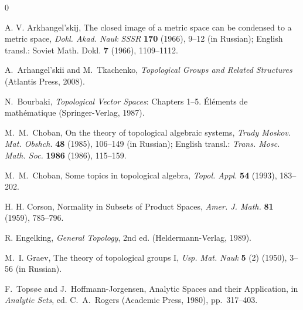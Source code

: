 \documentclass[a4paper]{amsart}
\theoremstyle{definition}
\begin{document}
\begin{thebibliography}{0}

A. V. Arkhangel'skij,
The closed image of a metric space can be condensed to a metric space, 
\emph{Dokl. Akad. Nauk SSSR} \textbf{170} (1966), 9--12 (in Russian); English transl.: 
Soviet Math. Dokl. \textbf{7} (1966), 1109--1112.

A.~Arhangel'skii and M.~Tkachenko,
\emph{Topological Groups and Related Structures} 
(Atlantis Press, 2008).

N.~Bourbaki, 
\emph{Topological Vector Spaces}: Chapters 1--5. \'El\'ements de math\'ematique
(Springer-Verlag,  1987). 

M.~M.~Choban,
On the theory of topological algebraic systems, 
\emph{Trudy Moskov. Mat. Obshch.} \textbf{48} (1985), 106--149 (in Russian); English transl.: 
\emph{Trans. Mosc. Math. Soc.} \textbf{1986} (1986), 115--159. 

M.~M.~Choban,
Some topics in topological algebra, 
\emph{Topol. Appl.} \textbf{54} (1993), 183--202. 

H. H. Corson,
Normality in Subsets of Product Spaces, 
\emph{Amer. J. Math.} \textbf{81} (1959), 785--796.

R. Engelking, \emph{General Topology}, 
2nd ed. (Heldermann-Verlag, 1989).

M.~I. Graev, 
The theory of topological groups I, 
\emph{Usp. Mat. Nauk}
\textbf{5} (2) (1950),
3--56 (in Russian).


F.~Tops\o e and J.~Hoffmann-Jorgensen,
Analytic Spaces and their Application, in \emph{Analytic Sets}, ed. C.~A.~Rogers 
(Academic Press, 1980), pp.~317--403.

\end{thebibliography}
\end{document}
